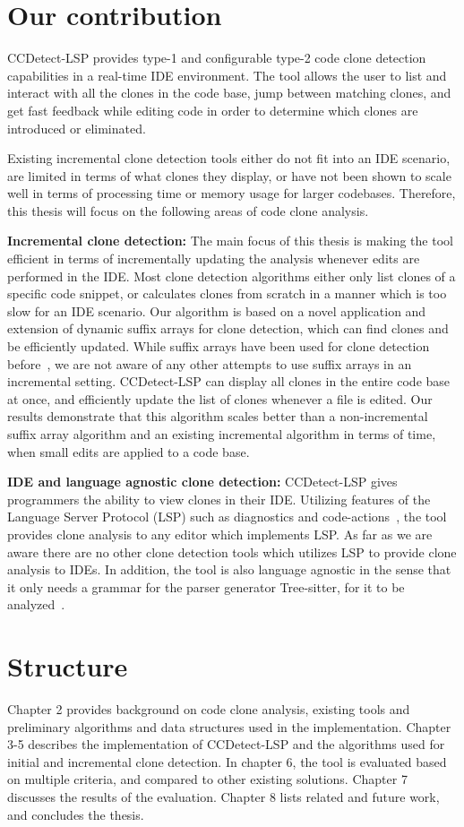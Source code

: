 \section{Our contribution}

CCDetect-LSP provides type-1 and configurable type-2 code clone detection capabilities in
a real-time IDE environment. The tool allows the user to list and interact with all the
clones in the code base, jump between matching clones, and get fast feedback while editing
code in order to determine which clones are introduced or eliminated.

Existing incremental clone detection tools either do not fit into an IDE scenario, are
limited in terms of what clones they display, or have not been shown to scale well in
terms of processing time or memory usage for larger codebases. Therefore, this thesis will
focus on the following areas of code clone analysis.

\textbf{Incremental clone detection:} The main focus of this thesis is making the tool
efficient in terms of incrementally updating the analysis whenever edits are performed in
the IDE. Most clone detection algorithms either only list clones of a specific code
snippet, or calculates clones from scratch in a manner which is too slow for an IDE
scenario. Our algorithm is based on a novel application and extension of dynamic suffix
arrays for clone detection, which can find clones and be efficiently updated. While suffix
arrays have been used for clone detection before~\cite{SHINOBI}, we are not aware of any
other attempts to use suffix arrays in an incremental setting. CCDetect-LSP can display
all clones in the entire code base at once, and efficiently update the list of clones
whenever a file is edited. Our results demonstrate that this algorithm scales better than
a non-incremental suffix array algorithm and an existing incremental algorithm in terms of
time, when small edits are applied to a code base.

\textbf{IDE and language agnostic clone detection:} CCDetect-LSP gives programmers the
ability to view clones in their IDE. Utilizing features of the Language Server Protocol
(LSP) such as diagnostics and code-actions~\cite{lsp}, the tool provides clone analysis to
any editor which implements LSP. As far as we are aware there are no other clone detection
tools which utilizes LSP to provide clone analysis to IDEs. In addition, the tool is also
language agnostic in the sense that it only needs a grammar for the parser generator
Tree-sitter, for it to be analyzed~\cite{treesitter}. 

\section{Structure}

Chapter 2 provides background on code clone analysis, existing tools and preliminary
algorithms and data structures used in the implementation. Chapter 3-5 describes the
implementation of CCDetect-LSP and the algorithms used for initial and incremental clone
detection. In chapter 6, the tool is evaluated based on multiple criteria, and compared to
other existing solutions. Chapter 7 discusses the results of the evaluation. Chapter 8
lists related and future work, and concludes the thesis.

